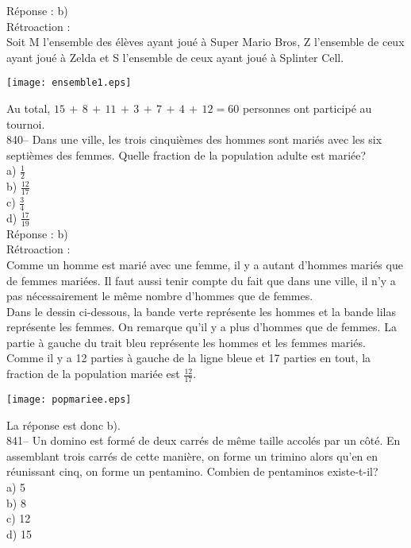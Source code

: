 ﻿\documentclass[letterpaper, 12pt]{article}
\begin{document}
R\'eponse : b)\\

R\'etroaction : \\
Soit M l'ensemble des \'el\`eves ayant jou\'e \`a Super Mario Bros,
Z l'ensemble de ceux ayant jou\'e \`a Zelda et S l'ensemble de ceux ayant
jou\'e \`a Splinter Cell.\\
    \begin{center}
    \texttt{[image: ensemble1.eps]}
    \end{center}
Au total, $15\,+\,8\,+\,11\,+\,3\,+\,7\,+\,4\,+\,12=60$ personnes ont
particip\'e au tournoi.\\

840-- Dans une ville, les trois cinqui\`emes des hommes sont mari\'es avec
les six septi\`emes des femmes.  Quelle fraction de la population adulte est
mari\'ee?\\
a) $\frac{1}{2}$\\ [2mm]
b) $\frac{12}{17}$\\[2mm]
c) $\frac{3}{4}$\\ [2mm]
d) $\frac{17}{19}$\\

R\'eponse : b)\\

R\'etroaction : \\
Comme un homme est mari\'e avec une femme, il y a autant d'hommes mari\'es
que de femmes mari\'ees.  Il faut aussi tenir compte du fait que dans une
ville, il n'y a pas n\'ecessairement le m\^eme nombre d'hommes que de
femmes.\\
Dans le dessin ci-dessous, la bande verte repr\'esente les hommes et la
bande lilas repr\'esente les femmes.  On remarque qu'il y a plus d'hommes
que de femmes.  La partie \`a gauche du trait bleu repr\'esente les hommes
et les femmes mari\'es.  Comme il y a 12 parties \`a gauche de la ligne
bleue et 17 parties en tout, la fraction de la population mari\'ee est
$\frac{12}{17}$.
    \begin{center}
    \texttt{[image: popmariee.eps]}
    \end{center}

La r\'eponse est donc b).\\

841-- Un domino est form\'e de deux carr\'es de m\^eme taille accol\'es par
un c\^ot\'e.  En assemblant trois carr\'es de cette mani\`ere, on forme un
trimino alors qu'en en r\'eunissant cinq, on forme un pentamino.  Combien de
pentaminos existe-t-il?\\
a) 5\\
b) 8\\
c) 12\\
d) 15\\
\end{document}

